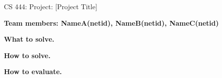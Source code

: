 \documentclass[11pt]{article}
\begin{document}
\begin{center}
\large{CS 444: Project: [Project Title]}\\
\end{center}
\vspace{5mm}

\textbf{Team members: NameA(netid), NameB(netid), NameC(netid)}




\noindent\textbf{What to solve.}
\lipsum[1]
\lipsum[2]

\textbf{How to solve.} 
\lipsum[1]


\textbf{How to evaluate.} 
\lipsum[1-2]

\newpage



\pagebreak


% 
%
% 

\end{document}
